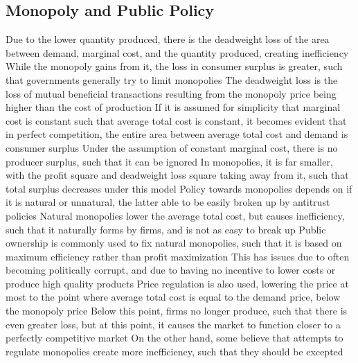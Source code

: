 \documentclass[11 pt, twoside]{article}
\newenvironment{outline*}
{
	\begin{outline}[enumerate]
	}
	{\end{outline}
}
\begin{document}
\subsection{Monopoly and Public Policy}
\begin{outline*}
\1 Due to the lower quantity produced, there is the deadweight loss of the area between demand, marginal cost, and the quantity produced, creating inefficiency
\2 While the monopoly gains from it, the loss in consumer surplus is greater, such that governments generally try to limit monopolies
\2 The deadweight loss is the loss of mutual beneficial transactions resulting from the monopoly price being higher than the cost of production
\1 If it is assumed for simplicity that marginal cost is constant such that average total cost is constant, it becomes evident that in perfect competition, the entire area between average total cost and demand is consumer surplus
\2 Under the assumption of constant marginal cost, there is no producer surplus, such that it can be ignored
\2 In monopolies, it is far smaller, with the profit square and deadweight loss square taking away from it, such that total surplus decreases under this model
\1 Policy towards monopolies depends on if it is natural or unnatural, the latter able to be easily broken up by antitrust policies
\2 Natural monopolies lower the average total cost, but causes inefficiency, such that it naturally forms by firms, and is not as easy to break up
\2 Public ownership is commonly used to fix natural monopolies, such that it is based on maximum efficiency rather than profit maximization
\3 This has issues due to often becoming politically corrupt, and due to having no incentive to lower costs or produce high quality products
\2 Price regulation is also used, lowering the price at most to the point where average total cost is equal to the demand price, below the monopoly price
\3 Below this point, firms no longer produce, such that there is even greater loss, but at this point, it causes the market to function closer to a perfectly competitive market
\2 On the other hand, some believe that attempts to regulate monopolies create more inefficiency, such that they should be excepted
\end{outline*}
\end{document}
